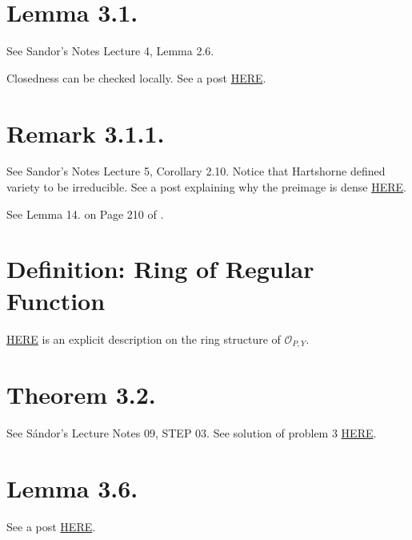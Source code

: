 \section{Lemma 3.1.}

See Sandor's Notes Lecture 4, Lemma 2.6.

Closedness can be checked locally. See a post \href{https://math.stackexchange.com/questions/717382/how-to-prove-that-z-is-closed-subset-iff-x-can-be-covered-by-open-subsets}{HERE}.

\section{Remark 3.1.1.}

See Sandor's Notes Lecture 5, Corollary 2.10.
Notice that Hartshorne defined variety to be irreducible.
See a post explaining why the preimage is dense \href{https://math.stackexchange.com/questions/2860498/regular-functions-are-determined-only-up-to-open-sets#:~:text=An%20important%20consequence%20of%20this,dense%2C%20hence%20equal%20to%20X.}{HERE}.

See Lemma 14. on Page 210 of \cite{bosch2013algebraic}.

\section{Definition: Ring of Regular Function}
\href{https://www2.math.ethz.ch/education/bachelor/lectures/fs2016/math/alg_geom/Solution8.pdf}{HERE} is an explicit description on the ring structure of $\mathcal O_{P,Y}$.
\section{Theorem 3.2.}

See S\'andor's Lecture Notes 09, STEP 03.
See solution of problem 3 \href{https://www2.math.ethz.ch/education/bachelor/lectures/fs2016/math/alg_geom/Solution8.pdf}{HERE}.
\section{Lemma 3.6.}

See a post \href{https://math.stackexchange.com/questions/457328/hartshorne-lemma-i-3-6}{HERE}.

